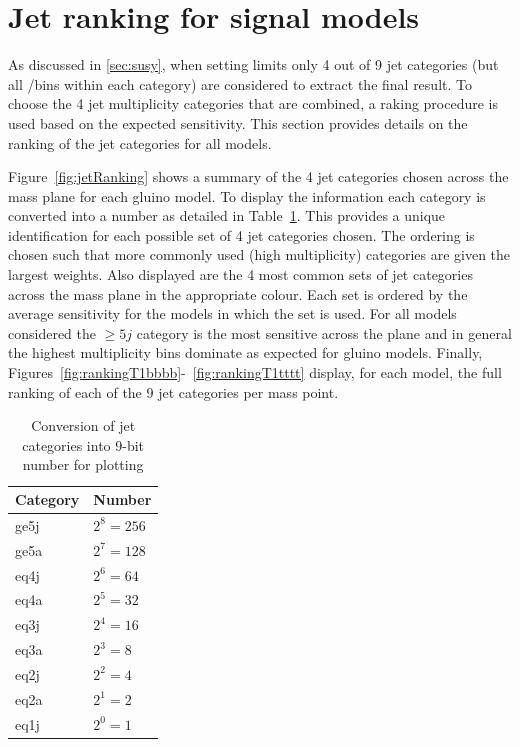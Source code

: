 \section{Jet ranking for signal models\label{jetRanking}}

As discussed in \ref{sec:susy}, when setting limits only 4 out of 9 jet categories (but all \nb/\scalht bins
within each category) are considered to extract the final result. 
To choose the 4 jet multiplicity categories that are combined, a raking procedure 
is used based on the expected sensitivity. This section provides details on the ranking of the jet
categories for all models.

Figure~\ref{fig:jetRanking} shows a summary of the 4 jet categories chosen across the mass plane for each gluino model.
To display the information each category is converted into a number as detailed in Table~\ref{tab:jetConversion}.
This provides a unique identification for each possible set of 4 jet categories chosen. The ordering
is chosen such that more commonly used (high multiplicity) categories are given the largest weights.
Also displayed are the 4 most common sets of jet categories across the mass plane in the appropriate colour.
Each set is ordered by the average sensitivity for the models in which the set is used. For all models 
considered the $\geq5j$ category is the most sensitive across the plane 
and in general the highest \njet multiplicity bins dominate as expected for gluino models.
Finally, Figures~\ref{fig:rankingT1bbbb}-~\ref{fig:rankingT1tttt} display, for each model, 
the full ranking of each of the 9 jet categories per mass point.

\begin{table}[h!]
\caption{Conversion of jet categories into 9-bit number for plotting}
\label{tab:jetConversion}
\centering
\begin{tabular}{ll}
Category    & Number \\      
\hline \hline
ge5j & $2^{8} = 256$ \\
ge5a & $2^{7} = 128$ \\
eq4j & $2^{6} = 64$  \\
eq4a & $2^{5} = 32$  \\
eq3j & $2^{4} = 16$  \\
eq3a & $2^{3} = 8$   \\
eq2j & $2^{2} = 4$   \\
eq2a & $2^{1} = 2$   \\
eq1j & $2^{0} = 1$   \\
\end{tabular}
\end{table}

